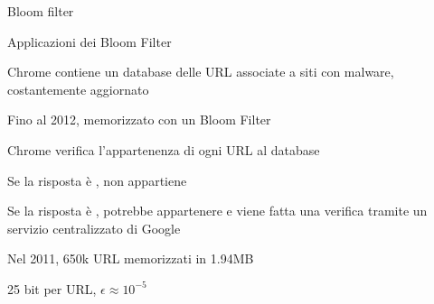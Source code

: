 \begin{frame}{Bloom filter}

\vspace{-6pt}
\end{frame}


\begin{frame}{Applicazioni dei Bloom Filter}
	
\BIL
\item Chrome contiene un database delle URL associate a siti con malware, costantemente aggiornato
\item Fino al 2012, memorizzato con un Bloom Filter
\item Chrome verifica l'appartenenza di ogni URL al database
\BI
\item Se la risposta è \FALSE, non appartiene
\item Se la risposta è \TRUE, potrebbe appartenere e viene fatta una verifica
tramite un servizio centralizzato di Google
\EI
\EIL

\BI
\item Nel 2011, 650k URL memorizzati in 1.94MB
\item 25 bit per URL, $\epsilon \approx 10^{-5}$
\EI

\end{frame}

